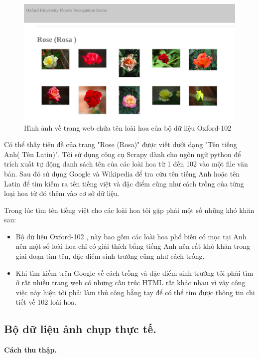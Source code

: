 \documentclass[12pt]{report}
\begin{document}
		\begin{figure}[h]
			\centering
			\includegraphics[scale=0.35]{rose_oxford}
			\caption{Hình ảnh về trang web chứa tên loài hoa của bộ dữ liệu Oxford-102}
			\label{fig:rose_oxford}
		\end{figure}
								
		Có thể thấy tiêu đề của trang "Rose (Rosa)" được viết dưới dạng "Tên tiếng Anh( Tên Latin)". Tôi sử dụng công cụ Scrapy dành cho ngôn ngữ python để trích xuất tự động danh sách tên của các loài hoa từ 1 đến 102 vào một file văn bản. Sau đó sử dụng Google và Wikipedia để tra cứu tên tiếng Anh hoặc tên Latin để tìm kiếm ra tên tiếng việt và đặc điểm cũng như cách trồng của từng loại hoa từ đó thêm vào cơ sở dữ liệu.
										
		Trong lúc tìm tên tiếng việt cho các loài hoa tôi gặp phải một số những khó khăn sau:
		\begin{itemize}
			\item Bộ dữ liệu Oxford-102 \cite{cia-Nilsback06}, này bao gồm các loài hoa phổ biến có mọc tại Anh nên một số loài hoa chỉ có giải thích bằng tiếng Anh nên rất khó khăn trong giai đoạn tìm tên, đặc điểm sinh trưởng cũng như cách trồng.
			\item Khi tìm kiếm trên Google về cách trồng và đặc điểm sinh trưởng tôi phải tìm ở rất nhiều trang web có những cấu trúc HTML rất khác nhau vì vậy công việc này hiện tôi phải làm thủ công bằng tay để có thể tìm được thông tin chi tiết về 102 loài hoa.
		\end{itemize}
								
		\subsection{Bộ dữ liệu ảnh chụp thực tế.}
		\textbf{Cách thu thập.}
								
\end{document}
